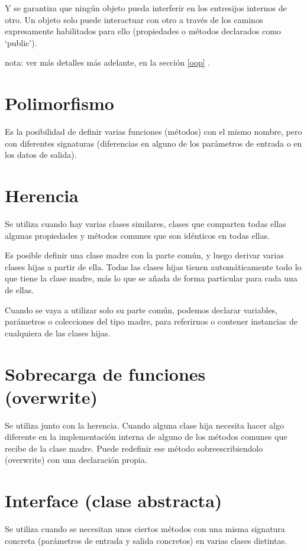 \documentclass[spanish,12pt,a4paper,final,oneside]{book}
\begin{document}
Y se garantiza que ningún objeto pueda interferir en los entresijos internos de otro. Un objeto solo puede interactuar con otro a través de los caminos expresamente habilitados para ello (propiedades o métodos declarados como ‘public’).

nota: ver más detalles más adelante, en la sección \ref{oop} .

\section{Polimorfismo}
Es la posibilidad de definir varias funciones (métodos) con el mismo nombre, pero con diferentes signaturas (diferencias en alguno de los parámetros de entrada o en los datos de salida).

\section{Herencia}
Se utiliza cuando hay varias clases similares, clases que comparten todas ellas algunas propiedades y métodos comunes que son idénticos en todas ellas. 

Es posible definir una clase madre con la parte común, y luego derivar varias clases hijas a partir de ella. Todas las clases hijas tienen automáticamente todo lo que tiene la clase madre, más lo que se añada de forma particular para cada una de ellas.

Cuando se vaya a utilizar solo su parte común, podemos declarar variables, parámetros o colecciones del tipo madre, para referirnos o contener instancias de cualquiera de las clases hijas.

\section{Sobrecarga de funciones (overwrite)}
Se utiliza junto con la herencia. Cuando alguna clase hija necesita hacer algo diferente en la implementación interna de alguno de los métodos comunes que recibe de la clase madre. Puede redefinir ese método sobreescribiendolo (overwrite) con una declaración propia. 

\section{Interface (clase abstracta)}
Se utiliza cuando se necesitan unos ciertos métodos con una misma signatura concreta (parámetros de entrada y salida concretos) en varias clases distintas. 
\end{document}
